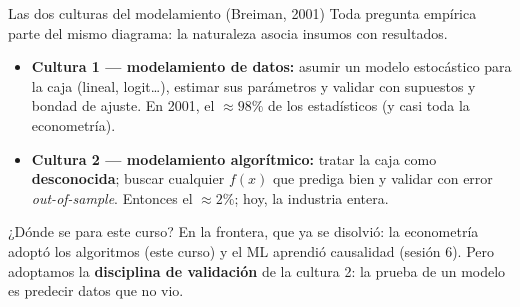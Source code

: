 \documentclass{beamer}
\newcommand{\1}{\mathbb{I}}
\begin{document}
\begin{frame}{Las dos culturas del modelamiento (Breiman, 2001)}
\small
Toda pregunta empírica parte del mismo diagrama: la naturaleza asocia insumos con resultados.

\vspace{0.2cm}
\begin{center}
\end{center}
\pause

\begin{itemize}\itemsep5pt
  \item \textbf{Cultura 1 --- modelamiento de datos:} asumir un modelo estocástico para la caja (lineal, logit\ldots), estimar sus parámetros y validar con supuestos y bondad de ajuste. En 2001, el $\approx 98\%$ de los estadísticos (y casi toda la econometría). \pause
  \item \textbf{Cultura 2 --- modelamiento algorítmico:} tratar la caja como \textbf{desconocida}; buscar cualquier $f(x)$ que prediga bien y validar con error \emph{out-of-sample}. Entonces el $\approx 2\%$; hoy, la industria entera. \pause
\end{itemize}

\begin{block}{¿Dónde se para este curso?}
En la frontera, que ya se disolvió: la econometría adoptó los algoritmos (este curso) y el ML aprendió causalidad (sesión 6). Pero adoptamos la \textbf{disciplina de validación} de la cultura 2: la prueba de un modelo es predecir datos que no vio.
\end{block}
\end{frame}
\end{document}
